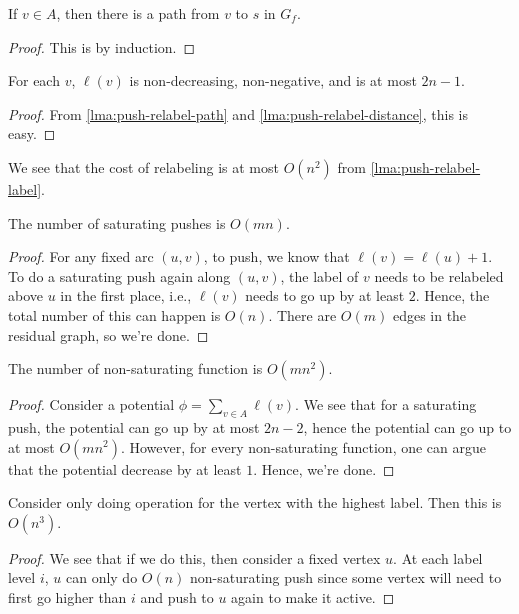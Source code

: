 \begin{lemma}\label{lma:push-relabel-path}
	If \(v \in A\), then there is a path from \(v\) to \(s\) in \(G_f\).
\end{lemma}
\begin{proof}
	This is by induction.
\end{proof}

\begin{lemma}\label{lma:push-relabel-label}
	For each \(v\), \(\ell (v)\)  is non-decreasing, non-negative, and is at most \(2n - 1\).
\end{lemma}
\begin{proof}
	From \autoref{lma:push-relabel-path} and \autoref{lma:push-relabel-distance}, this is easy.
\end{proof}

We see that the cost of relabeling is at most \(O(n^2)\) from \autoref{lma:push-relabel-label}.

\begin{lemma}
	The number of saturating pushes is \(O(mn)\).
\end{lemma}
\begin{proof}
	For any fixed arc \((u, v)\), to push, we know that \(\ell (v) = \ell (u) + 1\). To do a saturating push again along \((u, v)\), the label of \(v\) needs to be relabeled above \(u\) in the first place, i.e., \(\ell (v)\) needs to go up by at least \(2\). Hence, the total number of this can happen is \(O(n)\). There are \(O(m)\) edges in the residual graph, so we're done.
\end{proof}

\begin{lemma}
	The number of non-saturating function is \(O(mn^2)\).
\end{lemma}
\begin{proof}
	Consider a potential \(\phi = \sum_{v \in A} \ell (v)\). We see that for a saturating push, the potential can go up by at most \(2n - 2\), hence the potential can go up to at most \(O(mn^2)\). However, for every non-saturating function, one can argue that the potential decrease by at least \(1\). Hence, we're done.
\end{proof}

\begin{lemma}
	Consider only doing operation for the vertex with the highest label. Then this is \(O(n^3)\).
\end{lemma}
\begin{proof}
	We see that if we do this, then consider a fixed vertex \(u\). At each label level \(i\), \(u\) can only do \(O(n)\) non-saturating push since some vertex will need to first go higher than \(i\) and push to \(u\) again to make it active.
\end{proof}